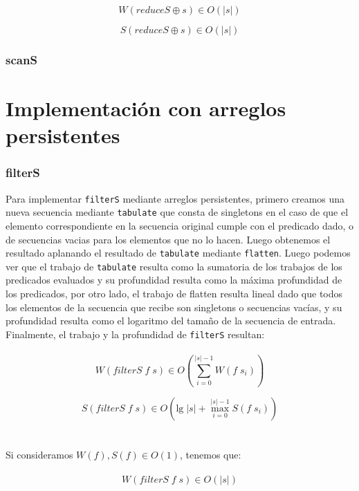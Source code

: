 \documentclass[a4paper,10pt]{article}
\begin{document}
		\begin{equation*}
			W \left( reduceS \oplus s \right) \in O \left( \vert s \vert \right)
		\end{equation*}
		
		\begin{equation*}
			S \left( reduceS \oplus s \right) \in O \left( \vert s \vert \right)
		\end{equation*}
	
\pagebreak
	\section*{\Large scanS}
	
	
\pagebreak	
\part*{Implementación con arreglos persistentes}

	\section*{\Large filterS}
		Para implementar \texttt{filterS} mediante arreglos persistentes, primero creamos una nueva secuencia mediante \texttt{tabulate} que consta de singletons en el caso de que el elemento correspondiente en la secuencia original cumple con el predicado dado, o de secuencias vacias para los elementos que no lo hacen. Luego obtenemos el resultado aplanando el resultado de \texttt{tabulate} mediante \texttt{flatten}. Luego podemos ver que el trabajo de \texttt{tabulate} resulta como la sumatoria de los trabajos de los predicados evaluados y su profundidad resulta como la máxima profundidad de los predicados, por otro lado, el trabajo de flatten resulta lineal dado que todos los elementos de la secuencia que recibe son singletons o secuencias vacías, y su profundidad resulta como el logaritmo del tamaño de la secuencia de entrada.
		Finalmente, el trabajo y la profundidad de \texttt{filterS} resultan: 
\\
\\	
	\begin{equation*}
		W \left( filterS \; f \; s \right) \in
		O \left(  \sum_{i=0}^{\vert s \vert -1} W(f \; s_i) \right)
	\end{equation*}

	\begin{equation*}
		S \left( filterS \; f \; s \right) \in
		O \left( \text{lg} \; \vert s \vert + \max_{i=0}^{\vert s \vert -1} S(f \; s_i) \right)
	\end{equation*}
\\
\\
		Si consideramos $W(f), S(f) \in O(1)$, tenemos que:
\\
\\
		\begin{equation*}
			W \left( filterS \;f \;s \right) \in O \left( \vert s \vert \right)
		\end{equation*}
		
\end{document}
